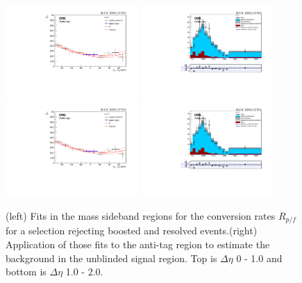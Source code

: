 \begin{figure}[h]
\centering
\includegraphics[width=0.45\textwidth]{F5/HH4b2p1SR_Fit_NRv1_unB1_boostres_dEta1.pdf}
\includegraphics[width=0.45\textwidth]{F5/HH4b2p1_Plot_NRv1_unB1_boostres_dEta1.pdf}\\
\includegraphics[width=0.45\textwidth]{F5/HH4b2p1SR_Fit_NRv1_unB1_boostres_dEta2.pdf}
\includegraphics[width=0.45\textwidth]{F5/HH4b2p1_Plot_NRv1_unB1_boostres_dEta2.pdf}
\caption{(left) Fits in the mass sideband regions for the conversion rates $R_{p/f}$ for a selection rejecting boosted and resolved events.(right) Application of those fits to the anti-tag region to estimate the background in the unblinded signal region. Top is $\Delta\eta$ 0 - 1.0 and bottom is $\Delta\eta$ 1.0 - 2.0.}
\label{fig:databoostres}
\end{figure}

